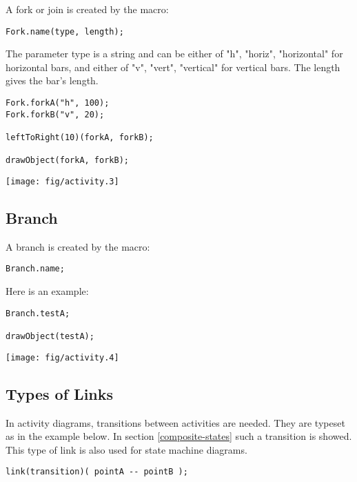 \documentclass{article}
\newcommand{\code}{\ttfamily}
\begin{document}
A fork or join is created by the macro:

\begin{verbatim}
Fork.name(type, length);
\end{verbatim}

The parameter {\code type} is a string and can be either of {\code "h"}, {\code "horiz"}, {\code "horizontal"} for horizontal bars, and either of {\code "v"}, {\code "vert"}, {\code "vertical"} for vertical bars. The {\code length} gives the bar's length.

\begin{multicols}{2}
\begin{verbatim}
Fork.forkA("h", 100);
Fork.forkB("v", 20);

leftToRight(10)(forkA, forkB);

drawObject(forkA, forkB);
\end{verbatim}
\columnbreak
\hspace{1cm}\texttt{[image: fig/activity.3]}
\end{multicols}

\subsection{Branch}

A branch is created by the macro:

\begin{verbatim}
Branch.name;
\end{verbatim}

Here is an example:

\begin{multicols}{2}
\begin{verbatim}
Branch.testA;

drawObject(testA);
\end{verbatim}
\columnbreak
\hspace{1cm}\texttt{[image: fig/activity.4]}
\end{multicols}


\subsection{Types of Links}

In activity diagrams, transitions between activities are needed. They are typeset
as in the example below. In section \ref{composite-states} such a transition
is showed. This type of link is also used for state machine diagrams.

\begin{verbatim}
link(transition)( pointA -- pointB );
\end{verbatim}
\end{document}
